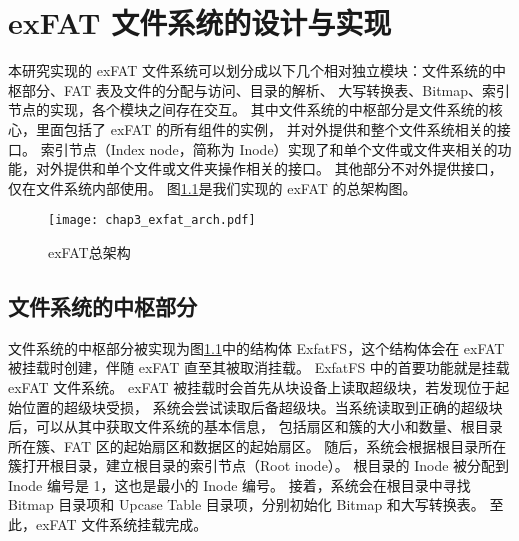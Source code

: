 
\chapter{exFAT 文件系统的设计与实现}
本研究实现的 exFAT 文件系统可以划分成以下几个相对独立模块：文件系统的中枢部分、FAT 表及文件的分配与访问、目录的解析、
大写转换表、Bitmap、索引节点的实现，各个模块之间存在交互。
其中文件系统的中枢部分是文件系统的核心，里面包括了 exFAT 的所有组件的实例，
并对外提供和整个文件系统相关的接口。
索引节点（Index node，简称为 Inode）\parencite{bovet2005understanding}实现了和单个文件或文件夹相关的功能，对外提供和单个文件或文件夹操作相关的接口。
其他部分不对外提供接口，仅在文件系统内部使用。
图\ref{fig:exfat_arch}是我们实现的 exFAT 的总架构图。

\begin{figure}[h]
    \centering
    \texttt{[image: chap3\_exfat\_arch.pdf]}
    \caption{exFAT总架构}
    \label{fig:exfat_arch}
\end{figure}
\section{文件系统的中枢部分}
文件系统的中枢部分被实现为图\ref{fig:exfat_arch}中的结构体 ExfatFS，这个结构体会在 exFAT 被挂载时创建，伴随 exFAT 直至其被取消挂载。
ExfatFS 中的首要功能就是挂载 exFAT 文件系统。
exFAT 被挂载时会首先从块设备上读取超级块，若发现位于起始位置的超级块受损，
系统会尝试读取后备超级块。当系统读取到正确的超级块后，可以从其中获取文件系统的基本信息，
包括扇区和簇的大小和数量、根目录所在簇、FAT 区的起始扇区和数据区的起始扇区。
随后，系统会根据根目录所在簇打开根目录，建立根目录的索引节点（Root inode）。
根目录的 Inode 被分配到 Inode 编号是 1，这也是最小的 Inode 编号。
接着，系统会在根目录中寻找 Bitmap 目录项和 Upcase Table 目录项，分别初始化 Bitmap 和大写转换表。
至此，exFAT 文件系统挂载完成。

